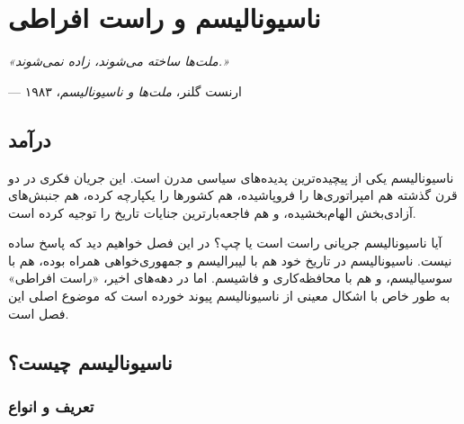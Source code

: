 \chapter{ناسیونالیسم و راست افراطی}

\begin{tcolorbox}[
    enhanced,
    colback=VeryLightGray, %
    colframe=LeftRed, %
    boxrule=2pt,
    arc=8pt,
    fonttitle=\bfseries\large,
    title={\rl{نقل‌قول آغازین}},
    attach boxed title to top center={yshift=-3mm},
    boxed title style={colback=LeftRed, colframe=LeftRed} %
]
\begin{center}
\Large\textit{«ملت‌ها ساخته می‌شوند، زاده نمی‌شوند.»}

\vspace{3mm}
\normalsize
--- ارنست گلنر، \textit{ملت‌ها و ناسیونالیسم}، ۱۹۸۳
\end{center}
\end{tcolorbox}

\vspace{5mm}

\section*{درآمد}


ناسیونالیسم یکی از پیچیده‌ترین پدیده‌های سیاسی مدرن است. این جریان فکری در دو قرن گذشته هم امپراتوری‌ها را فروپاشیده، هم کشورها را یکپارچه کرده، هم جنبش‌های آزادی‌بخش الهام‌بخشیده، و هم فاجعه‌بارترین جنایات تاریخ را توجیه کرده است.

آیا ناسیونالیسم جریانی راست است یا چپ؟ در این فصل خواهیم دید که پاسخ ساده نیست. ناسیونالیسم در تاریخ خود هم با لیبرالیسم و جمهوری‌خواهی همراه بوده، هم با سوسیالیسم، و هم با محافظه‌کاری و فاشیسم. اما در دهه‌های اخیر، «راست افراطی» به طور خاص با اشکال معینی از ناسیونالیسم پیوند خورده است که موضوع اصلی این فصل است.


\section{ناسیونالیسم چیست؟}

\subsection{تعریف و انواع}

